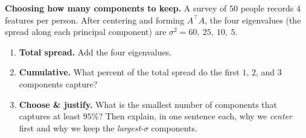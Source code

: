 \documentclass[10pt]{article}
\newcommand{\T}{^{\top}}
\begin{document}
\begin{tcolorbox}[colback=white, colframe=black!40, title=\textbf{Tier E --- Extension},
    fonttitle=\bfseries, arc=1.5mm, left=3mm, right=3mm, top=2mm, bottom=2mm, breakable]
\textbf{Choosing how many components to keep.} A survey of $50$ people records $4$ features per person. After
centering and forming $A\T A$, the four eigenvalues (the spread along each principal component) are
$\sigma^2=60,\ 25,\ 10,\ 5$.
\begin{enumerate}[leftmargin=1.7em, itemsep=9pt]
  \item \textbf{Total spread.} Add the four eigenvalues. \blank{2.6cm}
  \item \textbf{Cumulative.} What percent of the total spread do the first $1$, $2$, and $3$ components capture? \writeline
  \item \textbf{Choose \& justify.} What is the smallest number of components that captures at least $95\%$? Then explain, in one sentence each, why we \emph{center} first and why we keep the \emph{largest}-$\sigma$ components. 
\end{enumerate}
\end{tcolorbox}
\end{document}
